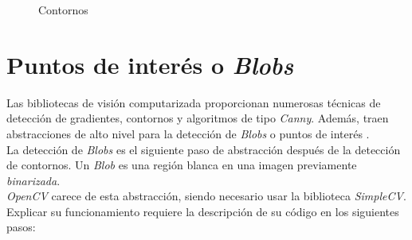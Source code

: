 \begin{figure}[H]
  \centering \setlength\fboxsep{0pt} \setlength\fboxrule{0.5pt}
  \caption{Contornos}
\end{figure}

\section{Puntos de interés o \emph{Blobs}}\label{tecnica:blobs}
Las bibliotecas de visión computarizada proporcionan numerosas
técnicas de detección de gradientes, contornos y algoritmos de tipo
\emph{Canny}. Además, traen abstracciones de alto nivel para la
detección de \emph{Blobs} o puntos de interés \emph{\citep*[1.7 Blob
  Detection]{simplecv_book-bib}} \emph{\citep*[5.4
  Blobs]{toennies2012guide}}.\\
La detección de \emph{Blobs} es el siguiente paso de abstracción
después de la detección de contornos. Un \emph{Blob} es una región
blanca en una imagen previamente \emph{binarizada}. \\
\emph{OpenCV} carece de esta abstracción, siendo necesario usar la
biblioteca \emph{SimpleCV}. Explicar su funcionamiento requiere la
descripción de su código en los siguientes pasos:
